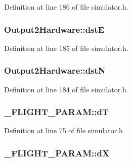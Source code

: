 Definition at line 186 of file simulator.\-h.

\hypertarget{group___h_i_t_l_plugin_ga5d4746c1f8dd9251dd5b37ced82d4a93}{
\subsubsection[{dst\-E}]{ Output2\-Hardware\-::dst\-E}}\label{group___h_i_t_l_plugin_ga5d4746c1f8dd9251dd5b37ced82d4a93}


Definition at line 185 of file simulator.\-h.

\hypertarget{group___h_i_t_l_plugin_gad276a9a114b2d57a5c4536e9ef0a9a12}{
\subsubsection[{dst\-N}]{ Output2\-Hardware\-::dst\-N}}\label{group___h_i_t_l_plugin_gad276a9a114b2d57a5c4536e9ef0a9a12}


Definition at line 184 of file simulator.\-h.

\hypertarget{group___h_i_t_l_plugin_gabba6faff155324d93353abc952708700}{
\subsubsection[{d\-T}]{ \-\_\-\-F\-L\-I\-G\-H\-T\-\_\-\-P\-A\-R\-A\-M\-::d\-T}}\label{group___h_i_t_l_plugin_gabba6faff155324d93353abc952708700}


Definition at line 75 of file simulator.\-h.

\hypertarget{group___h_i_t_l_plugin_gaa09582d7507d6bc84817aad1828e79a6}{
\subsubsection[{d\-X}]{ \-\_\-\-F\-L\-I\-G\-H\-T\-\_\-\-P\-A\-R\-A\-M\-::d\-X}}\label{group___h_i_t_l_plugin_gaa09582d7507d6bc84817aad1828e79a6}


